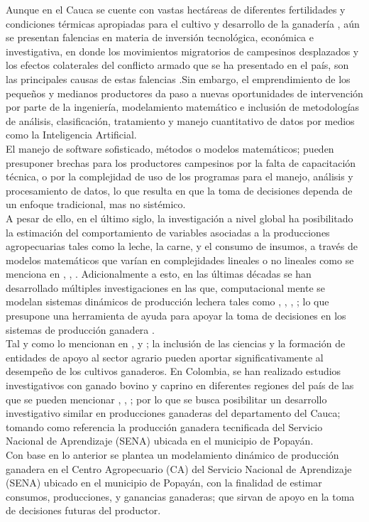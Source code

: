 Aunque en el Cauca se cuente con vastas hectáreas de diferentes fertilidades y condiciones térmicas apropiadas para el cultivo y desarrollo de la ganadería \cite{igac}, aún se presentan falencias en materia de inversión tecnológica, económica e investigativa, en donde los movimientos migratorios de campesinos desplazados y los efectos colaterales del conflicto armado que se ha presentado en el país, son las principales causas de estas falencias \cite{fao}.Sin embargo, el emprendimiento de los pequeños y medianos productores da paso a nuevas oportunidades de intervención por parte de la ingeniería, modelamiento matemático e inclusión de metodologías de análisis, clasificación, tratamiento y manejo cuantitativo de datos por medios como la Inteligencia Artificial. \\

El manejo de software sofisticado, métodos o modelos matemáticos; pueden presuponer brechas para los productores campesinos por la falta de capacitación técnica, o por la complejidad de uso de los programas para el manejo, análisis y procesamiento de datos, lo que resulta en que la toma de decisiones dependa de un enfoque tradicional, mas no sistémico.\\

A pesar de ello, en el último siglo, la investigación a nivel global ha posibilitado la estimación del comportamiento de variables asociadas a la producciones agropecuarias tales como la leche, la carne, y el consumo de insumos, a través de modelos matemáticos que varían en complejidades lineales o no lineales como se menciona en \cite{lechepaisa1}, \cite{caprinos}, \cite{colombiaherd}. Adicionalmente a esto, en las últimas décadas se han desarrollado múltiples investigaciones en las que, computacional mente se modelan sistemas dinámicos de producción lechera tales como \cite{janaina1}, \cite{janaina2}, \cite{hdmwallace}, \cite{avila1}; lo que presupone una herramienta de ayuda para apoyar la toma de decisiones en los sistemas de producción ganadera \cite{gavira}.\\

Tal y como lo mencionan en \cite{minagricultura}, \cite{ashby} y \cite{fao}; la inclusión de las ciencias y la formación de entidades de apoyo al sector agrario pueden aportar significativamente al desempeño de los  cultivos ganaderos. En Colombia, se han realizado estudios investigativos con ganado bovino y caprino en diferentes regiones del país de las que se pueden mencionar \cite{lechepaisa1}, \cite{lechepaisa2}, \cite{lechepastusa}; por lo que se busca posibilitar un desarrollo investigativo similar en producciones ganaderas del departamento del Cauca; tomando como referencia la producción ganadera tecnificada del Servicio Nacional de Aprendizaje (SENA) ubicada en el municipio de Popayán.\\

Con base en lo anterior se plantea un modelamiento dinámico de producción ganadera en el Centro Agropecuario (CA) del Servicio Nacional de Aprendizaje (SENA) ubicado en el municipio de Popayán, con la finalidad de estimar consumos, producciones, y ganancias ganaderas; que sirvan de apoyo en la toma de decisiones futuras del productor.